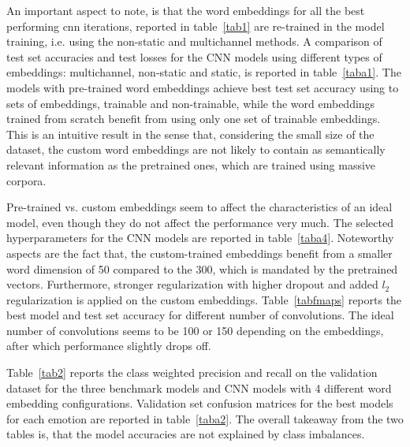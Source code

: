 \documentclass[conference]{IEEEtran}
\begin{document}
An important aspect to note, is that the word embeddings for all the best performing cnn iterations, reported in table~\ref{tab1} are re-trained in the model training, i.e. using the non-static and multichannel methods. A comparison of test set accuracies and test losses for the CNN models using different types of embeddings: multichannel, non-static and static, is reported in table~\ref{taba1}. The models with pre-trained word embeddings achieve best test set accuracy using to sets of embeddings, trainable and non-trainable, while the word embeddings trained from scratch benefit from using only one set of trainable embeddings. This is an intuitive result in the sense that, considering the small size of the dataset, the custom word embeddings are not likely to contain as semantically relevant information as the pretrained ones, which are trained using massive corpora.

Pre-trained vs. custom embeddings seem to affect the characteristics of an ideal model, even though they do not affect the performance very much. The selected hyperparameters for the CNN models are reported in table~\ref{taba4}. Noteworthy aspects are the fact that, the custom-trained embeddings benefit from a smaller word dimension of 50 compared to the 300, which is mandated by the pretrained vectors. Furthermore, stronger regularization with higher dropout and added $l_2$ regularization is applied on the custom embeddings. Table~\ref{tabfmaps} reports the best model and test set accuracy for different number of convolutions. The ideal number of convolutions seems to be 100 or 150 depending on the embeddings, after which performance slightly drops off.




Table~\ref{tab2} reports the class weighted precision and recall on the validation dataset for the three benchmark models and CNN models with 4 different word embedding configurations. Validation set confusion matrices for the best models for each emotion are reported in table~\ref{taba2}. The overall takeaway from the two tables is, that the model accuracies are not explained by class imbalances.
\end{document}
